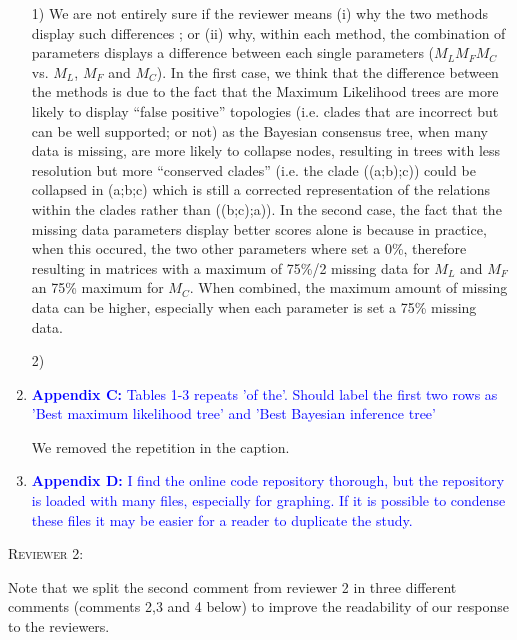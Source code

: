 \documentclass[12pt,letterpaper]{article}
\renewcommand{\section}[1]{%
\bigskip
\begin{center}
\begin{Large}
\normalfont\scshape #1
\medskip
\end{Large}
\end{center}}
\begin{document}
\begin{enumerate}
1) We are not entirely sure if the reviewer means (i) why the two methods display such differences ; or (ii) why, within each method, the combination of parameters displays a difference between each single parameters ($M_LM_FM_C$ vs. $M_L$, $M_F$ and $M_C$).
In the first case, we think that the difference between the methods is due to the fact that the Maximum Likelihood trees are more likely to display ``false positive'' topologies (i.e. clades that are incorrect but can be well supported; or not) as the Bayesian consensus tree, when many data is missing, are more likely to collapse nodes, resulting in trees with less resolution but more ``conserved clades'' (i.e. the clade ((a;b);c)) could be collapsed in (a;b;c) which is still a corrected representation of the relations within the clades rather than ((b;c);a)).
In the second case, the fact that the missing data parameters display better scores alone is because in practice, when this occured, the two other parameters where set a 0\%, therefore resulting in matrices with a maximum of 75\%/2 missing data for $M_L$ and $M_F$ an 75\% maximum for $M_C$.
When combined, the maximum amount of missing data can be higher, especially when each parameter is set a 75\% missing data.

2) %

\item{\textcolor{blue}{\textbf{Appendix C:} Tables 1-3 repeats 'of the'. Should label the first two rows as 'Best maximum likelihood tree' and 'Best Bayesian inference tree'}}

We removed the repetition in the caption. %

\item{\textcolor{blue}{\textbf{Appendix D:} I find the online code repository thorough, but the repository is loaded with many files, especially for graphing. If it is possible to condense these files it may be easier for a reader to duplicate the study.}}


\end{enumerate}

\section{Reviewer 2:}
Note that we split the second comment from reviewer 2 in three different comments (comments 2,3 and 4 below) to improve the readability of our response to the reviewers.
\end{document}
